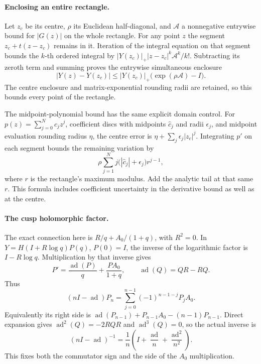 \paragraph{Enclosing an entire rectangle.}
Let $z_c$ be its centre, $\rho$ its Euclidean half-diagonal, and
$\mathcal A$ a nonnegative entrywise bound for $|G(z)|$ on the
whole rectangle. For any point $z$ the segment
$z_c+t(z-z_c)$ remains in it. Iteration of the integral equation
on that segment bounds the $k$-th ordered integral by
$|Y(z_c)|_+|z-z_c|^k\mathcal A^k/k!$. Subtracting its zeroth term
and summing proves the entrywise simultaneous enclosure
\[
 |Y(z)-Y(z_c)|
 \le |Y(z_c)|_+\bigl(\exp(\rho\mathcal A)-I\bigr).
\]
The centre enclosure and matrix-exponential rounding radii are
retained, so this bounds every point of the rectangle.

The midpoint-polynomial bound has the same explicit domain
control. For $p(z)=\sum_{j=0}^Nc_jz^j$, coefficient discs with
midpoints $\widehat c_j$ and radii $\epsilon_j$, and midpoint
evaluation rounding radius $\eta$, the centre error is
$\eta+\sum_j\epsilon_j|z_c|^j$. Integrating $p'$ on each segment
bounds the remaining variation by
\[
 \rho\sum_{j=1}^N j\bigl(|\widehat c_j|+\epsilon_j\bigr)r^{j-1},
\]
where $r$ is the rectangle's maximum modulus. Add the analytic
tail at that same $r$. This formula includes coefficient
uncertainty in the derivative bound as well as at the centre.

\paragraph{The cusp holomorphic factor.}
The exact connection here is
$R/q+A_0/(1+q)$, with $R^2=0$. In
$Y=H(I+R\log q)P(q)$, $P(0)=I$, the inverse of the logarithmic
factor is $I-R\log q$. Multiplication by that inverse gives
\[
 P'=\frac{\operatorname{ad}(P)}q+\frac{PA_0}{1+q},
 \qquad\operatorname{ad}(Q)=QR-RQ.
\]
Thus
\[
 (nI-\operatorname{ad})P_n
  =\sum_{j=0}^{n-1}(-1)^{n-1-j}P_jA_0.
\]
Equivalently its right side is
$\operatorname{ad}(P_{n-1})+P_{n-1}A_0-(n-1)P_{n-1}$.
Direct expansion gives
$\operatorname{ad}^2(Q)=-2RQR$ and
$\operatorname{ad}^3(Q)=0$, so the actual inverse is
\[
 (nI-\operatorname{ad})^{-1}
  =\frac1n\left(I+\frac{\operatorname{ad}}n
                   +\frac{\operatorname{ad}^2}{n^2}\right).
\]
This fixes both the commutator sign and the side of the $A_0$
multiplication.

